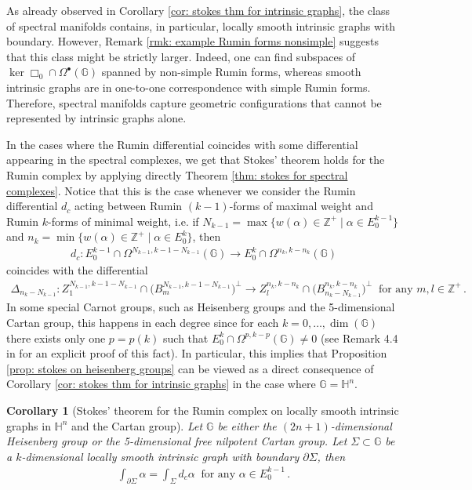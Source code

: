 \documentclass[dvipsnames]{amsart}
\newtheorem{corollary}[theorem]{Corollary}
\theoremstyle{definition}
\theoremstyle{definition}
\numberwithin{equation}{section}
\newcommand{\Z}{\mathbb{Z}}
\newcommand{\G}{\mathbb{G}}
\renewcommand{\H}{\mathbb{H}}
\begin{document}
    As already observed in Corollary \ref{cor: stokes thm for intrinsic graphs}, the class of spectral manifolds contains, in particular, locally smooth intrinsic graphs with boundary. However, Remark \ref{rmk: example Rumin forms nonsimple} suggests that this class might be strictly larger. Indeed, one can find subspaces of $\ker\Box_0\cap\Omega^\bullet(\G)$ spanned by non-simple Rumin forms, whereas smooth intrinsic graphs are in one-to-one correspondence with simple Rumin forms. Therefore, spectral manifolds capture geometric configurations that cannot be represented by intrinsic graphs alone.



In the cases where the Rumin differential coincides with some differential appearing in the spectral complexes, we get that Stokes' theorem holds for the Rumin complex by applying directly Theorem \ref{thm: stokes for spectral complexes}. Notice that this is the case whenever we consider the Rumin differential $d_c$ acting between Rumin $(k-1)$-forms of maximal weight and Rumin $k$-forms of minimal weight, i.e. if $N_{k-1}=\max\{w(\alpha)\in\Z^+\mid \alpha\in E_0^{k-1} \}$ and $n_k=\min\{w(\alpha)\in\Z^+\mid \alpha\in E_0^k\}$, then
\begin{align*}
    d_c\colon E_0^{k-1}\cap\Omega^{N_{k-1},k-1-N_{k-1}}(\G)\longrightarrow E_0^{k}\cap\Omega^{n_k,k-n_k}(\G)
\end{align*}
coincides with the differential
\begin{align*}
    \Delta_{n_k-N_{k-1}}\colon Z_1^{N_{k-1},k-1-N_{k-1}}\cap\big(B_m^{N_{k-1},k-1-N_{k-1}}\big)^\perp\longrightarrow Z_l^{n_k,k-n_k}\cap\big(B_{n_k-N_{k-1}}^{n_k,k-n_k}\big)^\perp\ \text{ for any }m,l\in\Z^+\,.
\end{align*}
In some special Carnot groups, such as Heisenberg groups and the 5-dimensional Cartan group, this happens in each degree since for each $k=0,\ldots,\operatorname{dim}(\G)$ there exists only one $p=p(k)$ such that $E_0^k\cap\Omega^{p,k-p}(\G)\neq 0$ (see Remark 4.4 in \cite{tripaldi2026spectralcomplexestruncatedmulticomplexes} for an explicit proof of this fact). In particular, this implies that Proposition \ref{prop: stokes on heisenberg groups} can be viewed as a direct consequence of Corollary \ref{cor: stokes thm for intrinsic graphs} in the case where $\G=\H^n$.

\begin{corollary}[Stokes' theorem for the Rumin complex on locally smooth intrinsic graphs in $\H^n$ and the Cartan group]\label{cor: stokes on Hn and cartan}
    Let $\G$ be either the $(2n+1)$-dimensional Heisenberg group or the 5-dimensional free nilpotent Cartan group. Let $\Sigma\subset\G$ be a $k$-dimensional locally smooth intrinsic graph with boundary $\partial\Sigma$, then
    \begin{align*}
        \int_{\partial \Sigma}\alpha=\int_\Sigma d_c\alpha\ \text{ for any }\alpha\in E_0^{k-1}\,.
    \end{align*}
    
\end{corollary}
\end{document}
